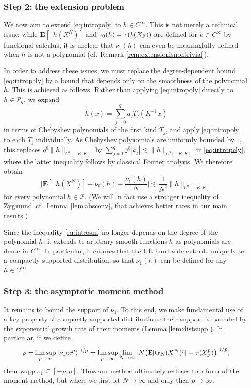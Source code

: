 \documentclass[10pt,reqno]{amsart}
\theoremstyle{definition}
\theoremstyle{remark}
\numberwithin{equation}{section}
\numberwithin{figure}{section}
\numberwithin{table}{section}
\newcommand{\supp}{\mathop{\mathrm{supp}}}
\newcommand{\ntrN}{\mathop{\mathrm{tr}_N}}
\newcommand{\EE}{\mathbf{E}}
\begin{document}
\subsubsection*{\bf Step 2: the extension problem}

We now aim to extend \eqref{eq:intropoly} to $h\in C^\infty$.
This is not merely a technical issue: while $\EE[\ntrN 
h(X^N)]$ and $\nu_0(h)=\tau(h(X_{\rm F}))$ are defined for $h\in 
C^\infty$ by functional calculus, it is unclear that $\nu_1(h)$ can 
even be meaningfully defined when $h$ is not a polynomial (cf.\ 
Remark \ref{rem:extensionisnontrivial}).

In order to address these issues, we must replace the degree-dependent 
bound \eqref{eq:intropoly} by a bound that depends only on the 
smoothness of the polynomial $h$. This is achieved as follows.
Rather than applying \eqref{eq:intropoly} 
directly to $h\in\mathcal{P}_q$, we expand
$$
	h(x)=\sum_{j=0}^q a_j T_j(K^{-1}x)
$$
in terms of Chebyshev polynomials of the first kind $T_j$, and apply
\eqref{eq:intropoly} to each $T_j$ individually. As Chebyshev polynomials
are uniformly bounded by $1$, this replaces $q^8\|h\|_{C^0[-K,K]}$ by 
$\sum_{j=1}^q j^8|a_j|\lesssim \|h\|_{C^9[-K,K]}$ in \eqref{eq:intropoly}, 
where the latter inequality follows by classical Fourier analysis. 
We therefore obtain
\begin{equation}
\label{eq:introsm}
	\bigg|\EE[\ntrN h(X^N)]-\nu_0(h) - \frac{\nu_1(h)}{N}\bigg|
	\lesssim \frac{1}{N^2}\|h\|_{C^9[-K,K]}
\end{equation}
for every polynomial $h\in\mathcal{P}$. (We will in fact use a stronger 
inequality of Zygmund, cf.\ Lemma \ref{lem:absconv}, that achieves better 
rates in our main results.)

Since the inequality \eqref{eq:introsm} no longer depends on the degree of 
the polynomial $h$, it extends to arbitrary smooth functions $h$ as 
polynomials are dense in $C^\infty$. In particular, it ensures that the 
left-hand side extends uniquely to a compactly supported distribution, so 
that $\nu_1(h)$ can be defined for any $h\in C^\infty$.


\subsubsection*{\bf Step 3: the asymptotic moment method}

It remains to bound the support of $\nu_1$. To this end, we make 
fundamental use of a key property of compactly supported distributions:
their support is bounded by the exponential growth rate of their moments
(Lemma \ref{lem:distsupp}). In particular, if we define
$$
	\rho =
	\limsup_{p\to\infty} |\nu_1(x^p)|^{1/p} =
	\limsup_{p\to\infty}\lim_{N\to\infty}
	\big| N\big(
        \EE[\ntrN (X^N)^p]- \tau(X_{\rm F}^p)\big)\big|^{1/p},
$$
then $\supp\nu_1 \subseteq [-\rho,\rho]$. Thus our method 
ultimately reduces to a form of the moment method, but where we first let 
$N\to\infty$ and only then $p\to\infty$.
\end{document}
